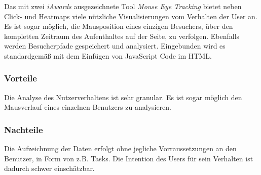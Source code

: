 Das mit zwei \textit{iAwards} ausgezeichnete Tool \textit{Mouse Eye Tracking\texttrademark} bietet neben Click- und Heatmaps viele nützliche Visualisierungen vom Verhalten der User an. Es ist sogar möglich, die Mausposition eines einzigen Besuchers, über den kompletten Zeitraum des Aufenthaltes auf der Seite, zu verfolgen. Ebenfalls werden Besucherpfade gespeichert und analysiert. Eingebunden wird es standardgemäß mit dem Einfügen von JavaScript Code im HTML.

\subsubsection*{Vorteile}
Die Analyse des Nutzerverhaltens ist sehr granular. Es ist sogar möglich den Mausverlauf eines einzelnen Benutzers zu analysieren.

\subsubsection*{Nachteile}
Die Aufzeichnung der Daten erfolgt ohne jegliche Vorraussetzungen an den Benutzer, in Form von z.B. Tasks. Die Intention des Users für sein Verhalten ist dadurch schwer einschätzbar.
















